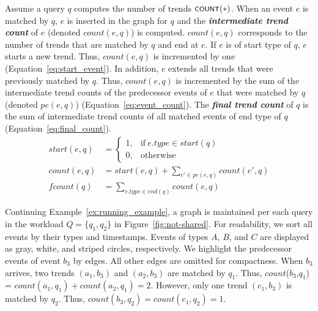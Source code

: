 Assume a query $q$ computes the number of trends $\textsf{\footnotesize COUNT}(*)$. 
When an event $e$ is matched by $q$, $e$ is inserted in the graph for $q$ and the \textbf{\textit{intermediate trend count}} of $e$ (denoted $\mathit{count}(e,q)$) is computed. $\mathit{count}(e,q)$ corresponds to the number of trends that are matched by $q$ and end at $e$. 
%
If $e$ is of start type of $q$, $e$ starts a new trend. Thus, $\mathit{count}(e,q)$ is incremented by one (Equation~\ref{eq:start_event}).
%
In addition, $e$ extends all trends that were previously matched by $q$. Thus, $\mathit{count}(e,q)$ is incremented by the sum of the intermediate trend counts of the predecessor events of $e$ that were matched by $q$ (denoted $\textit{pe}(e,q)$) (Equation~\ref{eq:event_count}). 
%
The \textbf{\textit{final trend count}} of $q$ is the sum of intermediate trend counts of all matched events of end type of $q$ (Equation~\ref{eq:final_count}).
%
\begin{align}
%
\mathit{start}(e,q) &=
    \begin{cases}
      1, & \text{if}\ \mathit{e.type} \in \mathit{start}(q) \\
      0, & \text{otherwise}
    \end{cases}
\label{eq:start_event}\\
%
\mathit{count}(e,q) &= 
\mathit{start}(e,q) + 
\sum_{e' \in \textit{pe}(e,q)}  \mathit{count}(e',q) 
\label{eq:event_count}\\
%
\mathit{fcount}(q) &= 
\sum_{\mathit{e.type} \in \textit{end}(q)}  \mathit{count}(e,q)
%
\label{eq:final_count}
\end{align}
\vspace{-5pt}





\begin{example}
Continuing Example~\ref{ex:running_example}, a graph is maintained per each query in the workload $Q=\{q_1,q_2\}$ in Figure~\ref{fig:not-shared}. 
For readability, we sort all events by their types and timestamps. Events of types $A$, $B$, and $C$ are displayed as gray, white, and striped circles, respectively. We highlight the predecessor events of event $b_3$ by edges. All other edges are omitted for compactness. 
When $b_3$ arrives, two trends $(a_1,b_3)$ and $(a_2,b_3)$ are matched by $q_1$. Thus, $count$($b_3$,$q_1$) = $count(a_1,q_1) + count(a_2,q_1) = 2$. However, only one trend $(c_1,b_3)$ is matched by $q_2$. Thus, $count(b_3,q_2) = count(c_1,q_2) = 1$.
\end{example}

